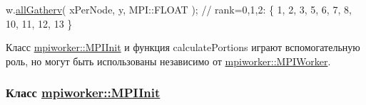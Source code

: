\begin{DoxyCode}
  w.\hyperlink{classmpiworker_1_1MPIWorker_a49fda2aa379265e74f9b7504ad67ee9a}{allGatherv}( xPerNode, y, MPI::FLOAT );         \textcolor{comment}{// rank=0,1,2: \{ 1, 2, 3, 5, 6, 7, 8, 10, 11,
       12, 13 \}}
\end{DoxyCode}


Класс \hyperlink{classmpiworker_1_1MPIInit}{mpiworker\-::\-M\-P\-I\-Init} и функция calculate\-Portions играют вспомогательную роль, но могут быть использованы независимо от \hyperlink{classmpiworker_1_1MPIWorker}{mpiworker\-::\-M\-P\-I\-Worker}.

\subsubsection*{Класс \hyperlink{classmpiworker_1_1MPIInit}{mpiworker\-::\-M\-P\-I\-Init}}


